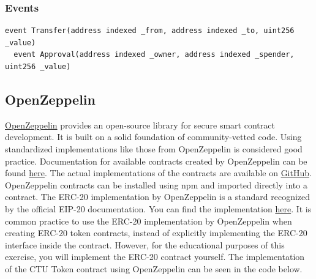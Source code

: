 \documentclass[12pt]{article}
\begin{document}
\subsubsection*{Events}

\noindent
\begin{minipage}{\textwidth}
\begin{lstlisting}[language=Solidity]
  event Transfer(address indexed _from, address indexed _to, uint256 _value)
  event Approval(address indexed _owner, address indexed _spender, uint256 _value)  
\end{lstlisting}
\end{minipage}

\subsection*{OpenZeppelin}

\href{https://www.openzeppelin.com/}{OpenZeppelin} provides an open-source library for secure smart contract development. It is built on a solid
foundation of community-vetted code. Using standardized implementations like those from OpenZeppelin is considered good practice. Documentation for available contracts created by OpenZeppelin can be found \href{https://docs.openzeppelin.com/contracts/4.x/}{here}. The actual implementations of the contracts are available on \href{https://github.com/OpenZeppelin/openzeppelin-contracts}{GitHub}. OpenZeppelin contracts can be installed using npm and imported directly into a contract. The ERC-20 implementation by OpenZeppelin is a standard recognized by the official EIP-20 documentation. You can find the implementation \href{https://github.com/OpenZeppelin/openzeppelin-contracts/blob/master/contracts/token/ERC20/ERC20.sol}{here}. It is common practice to use the ERC-20 implementation by OpenZeppelin when creating ERC-20 token contracts, instead of explicitly implementing the ERC-20 interface inside the contract. However, for the educational purposes of this exercise, you will implement the ERC-20 contract yourself. The implementation of the CTU Token contract using OpenZeppelin can be seen in the code below.
\end{document}
